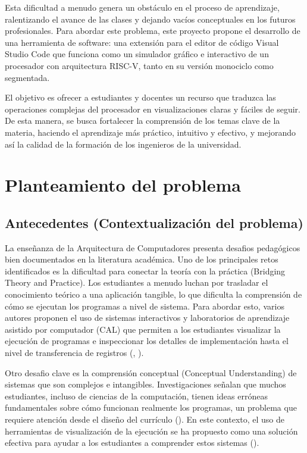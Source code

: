 \documentclass[12pt, letterpaper]{article}
\begin{document}
Esta dificultad a menudo genera un obstáculo en el proceso de aprendizaje, ralentizando el avance de las clases y dejando vacíos conceptuales en los futuros profesionales. Para abordar este problema, este proyecto propone el desarrollo de una herramienta de software: una extensión para el editor de código Visual Studio Code que funciona como un simulador gráfico e interactivo de un procesador con arquitectura RISC-V, tanto en su versión monociclo como segmentada.

El objetivo es ofrecer a estudiantes y docentes un recurso que traduzca las operaciones complejas del procesador en visualizaciones claras y fáciles de seguir. De esta manera, se busca fortalecer la comprensión de los temas clave de la materia, haciendo el aprendizaje más práctico, intuitivo y efectivo, y mejorando así la calidad de la formación de los ingenieros de la universidad.


\section{Planteamiento del problema}

\subsection{Antecedentes (Contextualización del problema)}
La enseñanza de la Arquitectura de Computadores presenta desafios pedagógicos bien documentados en la literatura académica. Uno de los principales retos identificados es la dificultad para conectar la teoría con la práctica (Bridging Theory and Practice). Los estudiantes a menudo luchan por trasladar el conocimiento teórico a una aplicación tangible, lo que dificulta la comprensión de cómo se ejecutan los programas a nivel de sistema. Para abordar esto, varios autores proponen el uso de sistemas interactivos y laboratorios de aprendizaje asistido por computador (CAL) que permiten a los estudiantes visualizar la ejecución de programas e inspeccionar los detalles de implementación hasta el nivel de transferencia de registros (\cite{djordjevic2008}, \cite{oztekin2011}).

Otro desafio clave es la comprensión conceptual (Conceptual Understanding) de sistemas que son complejos e intangibles. Investigaciones señalan que muchos estudiantes, incluso de ciencias de la computación, tienen ideas erróneas fundamentales sobre cómo funcionan realmente los programas, un problema que requiere atención desde el diseño del currículo (\cite{senske2014}). En este contexto, el uso de herramientas de visualización de la ejecución se ha propuesto como una solución efectiva para ayudar a los estudiantes a comprender estos sistemas (\cite{oztekin2011}).
\end{document}
